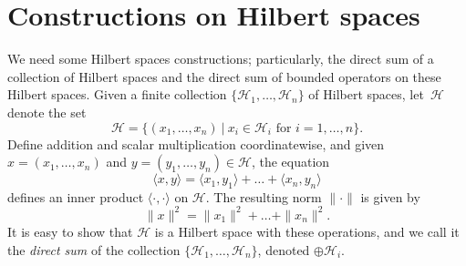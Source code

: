 \documentclass[12pt,a4paper]{report}
\theoremstyle{plain}
\theoremstyle{definition}
\newcommand{\1}{\mathbbm{1}}
\renewcommand{\H}{\mathcal{H}}
\begin{document}
\section{Constructions on Hilbert spaces}\label{section:hscons}
We need some Hilbert spaces constructions; particularly, the direct sum of a collection of Hilbert 
spaces and the direct sum of bounded operators on these Hilbert spaces.
Given a finite collection $\{\H_1,\dots,\H_n\}$ of Hilbert spaces, let~$\H$ denote the set
\[
	\H  = \{(x_1,\dots,x_n) ~|~ x_i \in \H_i \mbox { for } i=1,\dots,n\}.
\]
Define addition and scalar multiplication coordinatewise, and given $x=(x_1,\dots,x_n)$ and 
$y=(y_1,\dots,y_n) \in \H$, the equation
\[
	\langle x,y\rangle = \langle x_1,y_1\rangle + \dots + \langle x_n,y_n \rangle
\]
defines an inner product $\langle\cdot,\cdot\rangle$ on $\H$. The resulting norm $\|\cdot\|$ is 
given by
\[
	\|x\|^2 = \|x_1\|^2 + \dots + \|x_n\|^2.
\]
It is easy to show that $\H$ is a Hilbert space with these operations, and we call it the
\emph{direct sum} of the collection $\{\H_1,\dots,\H_n\}$, denoted $\oplus\H_i$.
\end{document}
